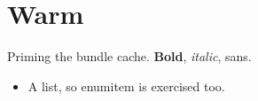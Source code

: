 \documentclass[10pt,letterpaper]{article}
\begin{document}
\section*{Warm}
Priming the bundle cache. \textbf{Bold}, \emph{italic}, \sffamily sans.
\begin{itemize}[leftmargin=*]\item A list, so enumitem is exercised too.\end{itemize}
\end{document}
